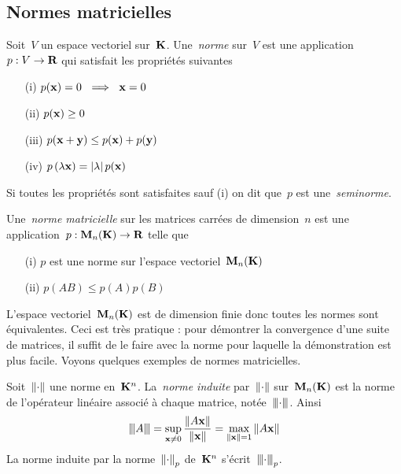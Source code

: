 \subsection{Normes matricielles}


\begin{definition}[norme]
	Soit~$V$ un espace vectoriel sur~$\mathbf{K}$.
	Une~\emph{norme} sur~$V$ est une application~$p:V\to\mathbf{R}$
	qui satisfait les propriétés suivantes
	\begin{enumerate}
		\item[(i)] $p(\mathbf{x}) = 0\ \implies\ \mathbf{x}=0$
		\item[(ii)] $p(\mathbf{x})\ge 0$
		\item[(iii)] $p(\mathbf{x}+\mathbf{y})\le p(\mathbf{x})+p(\mathbf{y})$
		\item[(iv)] $p\left(\lambda\mathbf{x}\right)=\left|\lambda\right|p(\mathbf{x})$
	\end{enumerate}
	Si toutes les propriétés sont satisfaites sauf (i) on dit que~$p$
	est une~\emph{seminorme}.
\end{definition}

\begin{definition}
	Une~\emph{norme matricielle} sur les matrices carrées de dimension~$n$ est
	une application~$p:\mathbf{M}_n(\mathbf{K})\to\mathbf{R}$ telle que
	\begin{enumerate}
		\item[(i)] $p$ est une norme sur l'espace vectoriel~$\mathbf{M}_n(\mathbf{K})$
		\item[(ii)] $p(AB) \le p(A) p(B)$
	\end{enumerate}
\end{definition}

L'espace vectoriel~$\mathbf{M}_n(\mathbf{K})$ est de dimension finie donc toutes les normes
sont équivalentes.  Ceci est très pratique : pour démontrer la convergence
d'une suite de matrices, il suffit de le faire avec la norme pour laquelle la
démonstration est plus facile.  Voyons quelques exemples de normes
matricielles.


\begin{definition}
	Soit~$\left\|\cdot\right\|$ une norme en~$\mathbf{K}^n$.  La~\emph{norme induite}
	par~$\left\|\cdot\right\|$ sur~$\mathbf{M}_n(\mathbf{K})$ est la norme de l'opérateur
	linéaire %
	associé à chaque matrice, notée~${\left\vert\kern-0.25ex\left\vert\kern-0.25ex\left\vert \cdot \right\vert\kern-0.25ex\right\vert\kern-0.25ex\right\vert}$.  Ainsi
	\[
		{\left\vert\kern-0.25ex\left\vert\kern-0.25ex\left\vert A \right\vert\kern-0.25ex\right\vert\kern-0.25ex\right\vert}
		=
		\sup_{\mathbf{x}\neq0}\frac{\left\|A\mathbf{x}\right\|}{\left\|\mathbf{x}\right\|}
		=
		\max_{\left\|\mathbf{x}\right\|=1}\left\|A\mathbf{x}\right\|
	\]
	La norme induite par la norme~$\left\|\cdot\right\|_p$ de~$\mathbf{K}^n$
	s'écrit~${\left\vert\kern-0.25ex\left\vert\kern-0.25ex\left\vert \cdot \right\vert\kern-0.25ex\right\vert\kern-0.25ex\right\vert}_p$.
\end{definition}

